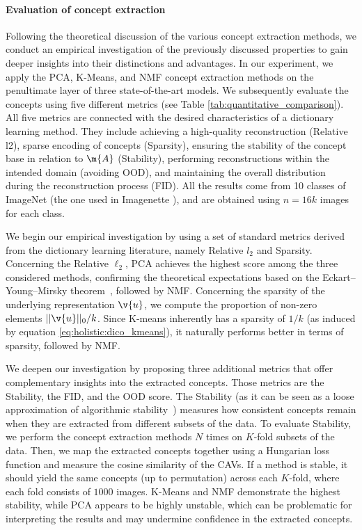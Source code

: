 \paragraph{Evaluation of concept extraction}
Following the theoretical discussion of the various concept extraction methods, we conduct an empirical investigation of the previously discussed properties to gain deeper insights into their distinctions and advantages. In our experiment, we apply the PCA, K-Means, and NMF concept extraction methods on the penultimate layer of three state-of-the-art models. We subsequently evaluate the concepts using five different metrics (see Table \ref{tab:quantitative_comparison}). 
All five metrics are connected with the desired characteristics of a dictionary learning method. They include achieving a high-quality reconstruction (Relative l2), sparse encoding of concepts (Sparsity), ensuring the stability of the concept base in relation to $\m{A}$ (Stability), performing reconstructions within the intended domain (avoiding OOD), and maintaining the overall distribution during the reconstruction process (FID).
All the results come from 10 classes of ImageNet (the one used in Imagenette \cite{imagenette}), and are obtained using $n=16k$ images for each class. 



We begin our empirical investigation by using a set of standard metrics derived from the dictionary learning literature, namely Relative $l_2$ and Sparsity. 
Concerning the Relative $\ell_2$, PCA achieves the highest score among the three considered methods, confirming the theoretical expectations based on the Eckart–Young–Mirsky theorem~\cite{eckart1936approximation}, followed by NMF.
Concerning the sparsity of the underlying representation $\v{u}$, we compute the proportion of non-zero elements $||\v{u}||_0 / k$. Since K-means inherently has a sparsity of $1 / k$ (as induced by equation \ref{eq:holistic:dico_kmeans}), it naturally performs better in terms of sparsity, followed by NMF.


We deepen our investigation by proposing three additional metrics that offer complementary insights into the extracted concepts. Those metrics are the Stability, the FID, and the OOD score.
The Stability (as it can be seen as a loose approximation of algorithmic stability~\cite{bousquet2002stability}) measures how consistent concepts remain when they are extracted from different subsets of the data.
To evaluate Stability, we perform the concept extraction methods $N$ times on $K$-fold subsets of the data. Then, we map the extracted concepts together using a Hungarian loss function and measure the cosine similarity of the CAVs. If a method is stable, it should yield the same concepts (up to permutation) across each $K$-fold, where each fold consists of $1000$ images.
K-Means and NMF demonstrate the highest stability, while PCA appears to be highly unstable, which can be problematic for interpreting the results and may undermine confidence in the extracted concepts.

